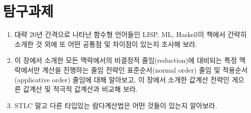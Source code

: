     \section*{탐구과제}

\begin{enumerate}
\def\labelenumi{\arabic{enumi}.}
\tightlist
\item
  대략 20년 간격으로 나타난 함수형 언어들인 LISP, ML, Haskell이 책에서
  간략히 소개한 것 외에 또 어떤 공통점 및 차이점이 있는지 조사해 보라.
\item
  이 장에서 소개한 모든 맥락에서의 비결정적 줄임(reduction)에 대비되는
  특정 맥락에서만 계산을 진행하는 줄임 전략인 표준순서(normal order)
  줄임 및 적용순서(applicative order) 줄임에 대해 알아보고, 이 장에서
  소개한 값계산 전략인 게으른 값계산 및 적극적 값계산과 비교해 보라.
\item
  STLC 말고 다른 타입있는 람다계산법은 어떤 것들이 있는지 알아보라.
\end{enumerate}


    
    
    
